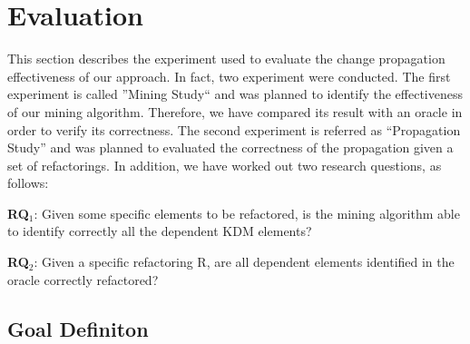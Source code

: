 
\section{Evaluation}\label{sec:evaluation}

This section describes the experiment used to evaluate the change propagation effectiveness of our approach. In fact, two experiment were conducted. The first experiment is called ''Mining Study`` and was planned to identify the effectiveness of our  mining algorithm. Therefore, we have compared its result with an oracle in order to verify its correctness. The second experiment is referred as ``Propagation Study'' and was planned to evaluated the correctness of the propagation given a set of refactorings. In addition, we have worked out two research questions, as follows:


\textbf{RQ$_{1}$}: Given some specific elements to be refactored, is the mining algorithm able to identify correctly all the dependent KDM elements?

\textbf{RQ$_{2}$}: Given a specific refactoring R, are all dependent elements identified in the oracle correctly refactored?
 

\subsection{Goal Definiton}\label{sec:goal_definition}

